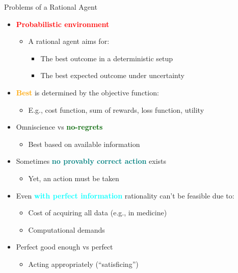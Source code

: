 \documentclass[
  10pt,
  ignorenonframetext,
]{beamer}
\providecommand{\tightlist}{%
  \setlength{\itemsep}{0pt}\setlength{\parskip}{0pt}}
\begin{document}
\begin{frame}{Problems of a Rational Agent}
\label{problems-of-a-rational-agent}
\begin{itemize}
\tightlist
\item
  \textbf{\textcolor{red}{Probabilistic environment}}

  \begin{itemize}
  \tightlist
  \item
    A rational agent aims for:

    \begin{itemize}
    \tightlist
    \item
      The best outcome in a deterministic setup
    \item
      The best expected outcome under uncertainty
    \end{itemize}
  \end{itemize}
\item
  \textbf{\textcolor{orange}{Best}} is determined by the objective
  function:

  \begin{itemize}
  \tightlist
  \item
    E.g., cost function, sum of rewards, loss function, utility
  \end{itemize}
\item
  Omniscience vs \textbf{\textcolor{darkgreen}{no-regrets}}

  \begin{itemize}
  \tightlist
  \item
    Best based on available information
  \end{itemize}
\item
  Sometimes \textbf{\textcolor{teal}{no provably correct action}} exists

  \begin{itemize}
  \tightlist
  \item
    Yet, an action must be taken
  \end{itemize}
\item
  Even \textbf{\textcolor{cyan}{with perfect information}} rationality
  can't be feasible due to:

  \begin{itemize}
  \tightlist
  \item
    Cost of acquiring all data (e.g., in medicine)
  \item
    Computational demands
  \end{itemize}
\item
  Perfect good enough vs perfect

  \begin{itemize}
  \tightlist
  \item
    Acting appropriately (``satisficing'')
  \end{itemize}
\end{itemize}
\end{frame}
\end{document}
